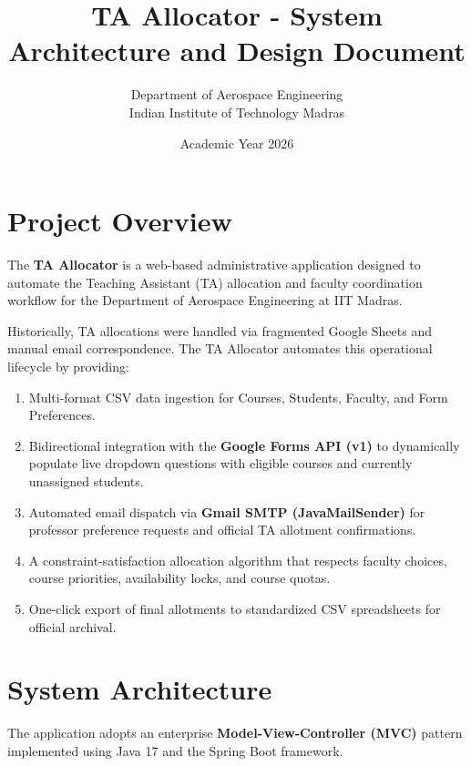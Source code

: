 \documentclass[12pt, a4paper]{article}
\title{\textbf{TA Allocator - System Architecture and Design Document}}
\author{Department of Aerospace Engineering \\ Indian Institute of Technology Madras}
\date{Academic Year 2026}
\begin{document}
\maketitle
\tableofcontents
\newpage

\section{Project Overview}
The \textbf{TA Allocator} is a web-based administrative application designed to automate the Teaching Assistant (TA) allocation and faculty coordination workflow for the Department of Aerospace Engineering at IIT Madras. 

Historically, TA allocations were handled via fragmented Google Sheets and manual email correspondence. The TA Allocator automates this operational lifecycle by providing:
\begin{enumerate}[noitemsep]
    \item Multi-format CSV data ingestion for Courses, Students, Faculty, and Form Preferences.
    \item Bidirectional integration with the \textbf{Google Forms API (v1)} to dynamically populate live dropdown questions with eligible courses and currently unassigned students.
    \item Automated email dispatch via \textbf{Gmail SMTP (JavaMailSender)} for professor preference requests and official TA allotment confirmations.
    \item A constraint-satisfaction allocation algorithm that respects faculty choices, course priorities, availability locks, and course quotas.
    \item One-click export of final allotments to standardized CSV spreadsheets for official archival.
\end{enumerate}

\section{System Architecture}
The application adopts an enterprise \textbf{Model-View-Controller (MVC)} pattern implemented using Java 17 and the Spring Boot framework.
\end{document}
